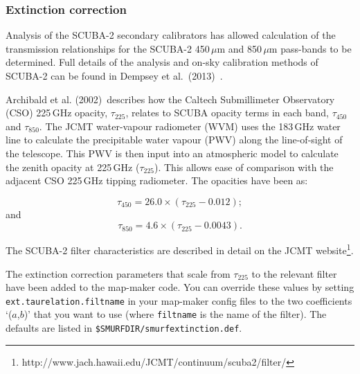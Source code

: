 \documentclass[twoside,11pt]{article}
\newcommand{\htmladdnormallinkfoot}[2]{#1\footnote{#2}}
\newcommand{\xlabel}[1]{}
\renewcommand{\_}{\texttt{\symbol{95}}}
\newcommand{\param}[1]{\texttt{#1}}
\begin{document}
\subsubsection{\xlabel{extinction}Extinction correction}

Analysis of the SCUBA-2 secondary calibrators has allowed calculation
of the transmission relationships for the SCUBA-2 450\,$\mu$m and
850\,$\mu$m pass-bands to be determined. Full details of the analysis
and on-sky calibration methods of SCUBA-2 can be found in Dempsey et
al.\ (2013)~\cite{dempsey12}\cite{dempsey-spie}.

Archibald et al. (2002)\,\cite{archibald} describes how the Caltech
Submillimeter Observatory (CSO) 225\,GHz opacity, $\tau_{225}$,
relates to SCUBA opacity terms in each band, $\tau_{450}$ and
$\tau_{850}$. The JCMT water-vapour radiometer (WVM) uses the 183\,GHz
water line to calculate the precipitable water vapour (PWV) along the
line-of-sight of the telescope. This PWV is then input into an
atmospheric model to calculate the zenith opacity at 225\,GHz
($\tau_{225}$). This allows ease of comparison with the adjacent CSO
225\,GHz tipping radiometer. The opacities have been as:

\begin{equation}
\tau_{450} = 26.0 \times (\tau_{225} - 0.012);
\end{equation}
and
\begin{equation}
\tau_{850} = 4.6 \times (\tau_{225} - 0.0043).
\end{equation}

The SCUBA-2 filter characteristics are described in
detail \htmladdnormallinkfoot{on the JCMT
website}{http://www.jach.hawaii.edu/JCMT/continuum/scuba2/filter/}.

The extinction correction parameters that scale from $\tau_{225}$ to
the relevant filter have been added to the map-maker code. You can
override these values by setting \param{ext.taurelation.filtname} in
your map-maker config files to the two coefficients `($a$,$b$)' that you
want to use (where \texttt{filtname} is the name of the filter). The
defaults are listed in \texttt{\$SMURF\_DIR/smurf\_extinction.def}.

\newpage
\end{document}
